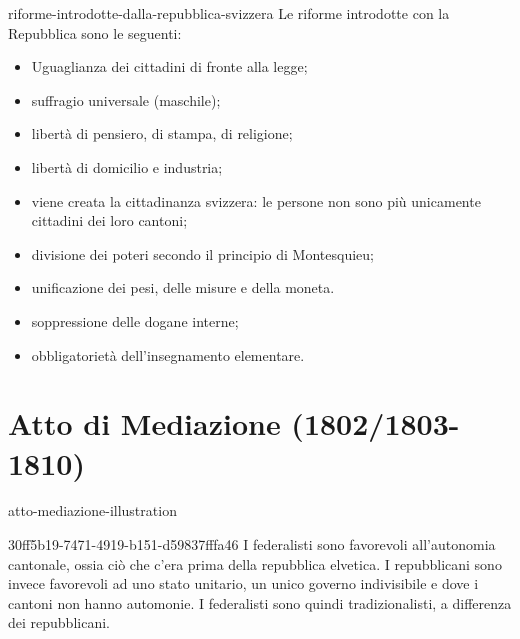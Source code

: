 \documentclass[preview]{standalone}
\begin{document}
\begin{snippet}{riforme-introdotte-dalla-repubblica-svizzera}
    Le riforme introdotte con la Repubblica sono le seguenti:
    \begin{itemize}
        \item Uguaglianza dei cittadini di fronte alla legge;
        \item suffragio universale (maschile);
        \item libertà di pensiero, di stampa, di religione;
        \item libertà di domicilio e industria;
        \item viene creata la cittadinanza svizzera: le persone non sono più unicamente cittadini dei loro cantoni;
        \item divisione dei poteri secondo il principio di Montesquieu;
        \item unificazione dei pesi, delle misure e della moneta.
        \item soppressione delle dogane interne;
        \item obbligatorietà dell'insegnamento elementare.
    \end{itemize}
\end{snippet}


\section{Atto di Mediazione (1802/1803-1810)}

\begin{snippet}{atto-mediazione-illustration}
    \begin{center}
    \end{center}
\end{snippet}

\begin{snippet}{30ff5b19-7471-4919-b151-d59837fffa46}
    I federalisti sono favorevoli all'autonomia cantonale, ossia ciò che c'era prima della repubblica elvetica.
    I repubblicani sono invece favorevoli ad uno stato unitario, un unico governo indivisibile e dove i cantoni non hanno automonie.
    I federalisti sono quindi tradizionalisti, a differenza dei repubblicani.
\end{snippet}
\end{document}
